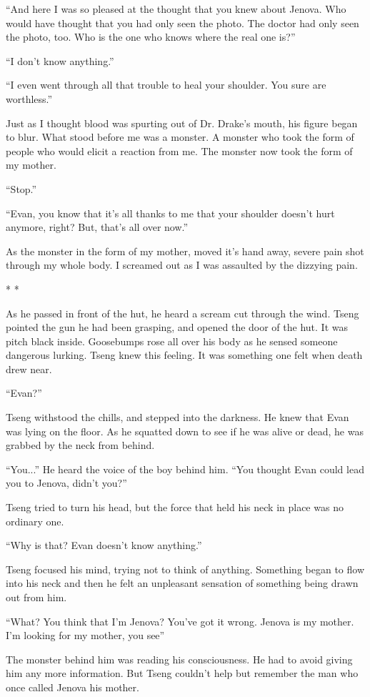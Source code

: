 \documentclass[oneside]{book}
\begin{document}
“And here I was so pleased at the thought that you knew about Jenova. Who would have thought that you had only seen the photo. The doctor had only seen the photo, too. Who is the one who knows where the real one is?”

“I don’t know anything.”

“I even went through all that trouble to heal your shoulder. You sure are worthless.”

Just as I thought blood was spurting out of Dr. Drake’s mouth, his figure began to blur. What stood before me was a monster. A monster who took the form of people who would elicit a reaction from me. The monster now took the form of my mother.

“Stop.”

“Evan, you know that it’s all thanks to me that your shoulder doesn’t hurt anymore, right? But, that’s all over now.”

As the monster in the form of my mother, moved it’s hand away, severe pain shot through my whole body. I screamed out as I was assaulted by the dizzying pain.

* *

As he passed in front of the hut, he heard a scream cut through the wind. Tseng pointed the gun he had been grasping, and opened the door of the hut. It was pitch black inside. Goosebumps rose all over his body as he sensed someone dangerous lurking. Tseng knew this feeling. It was something one felt when death drew near.

“Evan?”

Tseng withstood the chills, and stepped into the darkness. He knew that Evan was lying on the floor. As he squatted down to see if he was alive or dead, he was grabbed by the neck from behind.

“You...” He heard the voice of the boy behind him. “You thought Evan could lead you to Jenova, didn’t you?”

Tseng tried to turn his head, but the force that held his neck in place was no ordinary one.

“Why is that? Evan doesn’t know anything.”

Tseng focused his mind, trying not to think of anything. Something began to flow into his neck and then he felt an unpleasant sensation of something being drawn out from him.

“What? You think that I’m Jenova? You’ve got it wrong. Jenova is my mother. I’m looking for my mother, you see”

The monster behind him was reading his consciousness. He had to avoid giving him any more information. But Tseng couldn’t help but remember the man who once called Jenova his mother.
\end{document}
